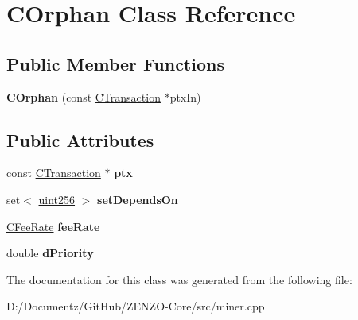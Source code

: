 \hypertarget{class_c_orphan}{}\section{C\+Orphan Class Reference}
\label{class_c_orphan}
\subsection*{Public Member Functions}
\begin{DoxyCompactItemize}
\item 
\mbox{\label{class_c_orphan_a7950b07537159af9de79cdc60d836d46}} 
{\bfseries C\+Orphan} (const \mbox{\hyperlink{class_c_transaction}{C\+Transaction}} $\ast$ptx\+In)
\end{DoxyCompactItemize}
\subsection*{Public Attributes}
\begin{DoxyCompactItemize}
\item 
\mbox{\label{class_c_orphan_a6bc886fad47f30a4c1cc80dc764e4095}} 
const \mbox{\hyperlink{class_c_transaction}{C\+Transaction}} $\ast$ {\bfseries ptx}
\item 
\mbox{\label{class_c_orphan_a1b19183565d42c20ded09a2cc787fc50}} 
set$<$ \mbox{\hyperlink{classuint256}{uint256}} $>$ {\bfseries set\+Depends\+On}
\item 
\mbox{\label{class_c_orphan_a2aab629162d580085082408643149e92}} 
\mbox{\hyperlink{class_c_fee_rate}{C\+Fee\+Rate}} {\bfseries fee\+Rate}
\item 
\mbox{\label{class_c_orphan_a899f7928b6d4e9206ce04d5b2953da33}} 
double {\bfseries d\+Priority}
\end{DoxyCompactItemize}


The documentation for this class was generated from the following file\+:\begin{DoxyCompactItemize}
\item 
D\+:/\+Documentz/\+Git\+Hub/\+Z\+E\+N\+Z\+O-\/\+Core/src/miner.\+cpp\end{DoxyCompactItemize}
